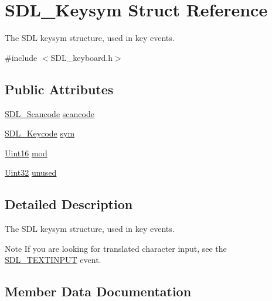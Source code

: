 \hypertarget{struct_s_d_l___keysym}{}\section{S\+D\+L\+\_\+\+Keysym Struct Reference}
\label{struct_s_d_l___keysym}


The S\+DL keysym structure, used in key events.  




{\ttfamily \#include $<$S\+D\+L\+\_\+keyboard.\+h$>$}

\subsection*{Public Attributes}
\begin{DoxyCompactItemize}
\item 
\hyperlink{_s_d_l__scancode_8h_a82ab7cff701034fb40a47b5b3a02777b}{S\+D\+L\+\_\+\+Scancode} \hyperlink{struct_s_d_l___keysym_ad47e9120a511e2efc7ec0c6d8a5ec51e}{scancode}
\item 
\hyperlink{_s_d_l__keycode_8h_ae9265f064f13f0f74dfca26a67875171}{S\+D\+L\+\_\+\+Keycode} \hyperlink{struct_s_d_l___keysym_a082ff1fd787b79fa6c3a445deb225f08}{sym}
\item 
\hyperlink{_s_d_l__stdinc_8h_a31fcc0a076c9068668173ee26d33e42b}{Uint16} \hyperlink{struct_s_d_l___keysym_ab519d1b8a9939d3d035f7103f3208291}{mod}
\item 
\hyperlink{_s_d_l__stdinc_8h_add440eff171ea5f55cb00c4a9ab8672d}{Uint32} \hyperlink{struct_s_d_l___keysym_ab1d0a50cc619966fb06b92e15cc46dd9}{unused}
\end{DoxyCompactItemize}


\subsection{Detailed Description}
The S\+DL keysym structure, used in key events. 

\begin{DoxyNote}{Note}
If you are looking for translated character input, see the \hyperlink{_s_d_l__events_8h_a3b589e89be6b35c02e0dd34a55f3fccaa4fa2570088f6b9cbd109ae91b511368f}{S\+D\+L\+\_\+\+T\+E\+X\+T\+I\+N\+P\+UT} event. 
\end{DoxyNote}


\subsection{Member Data Documentation}
